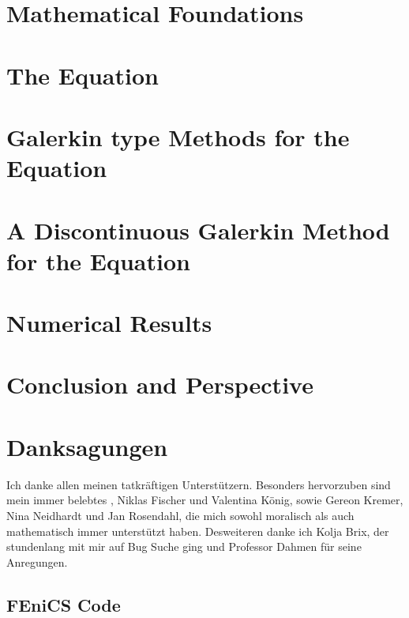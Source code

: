 \documentclass{template}
\begin{document}
\chapter{Mathematical Foundations}
\label{ch:TheoreticalBackground}



\chapter{The \MA Equation}
\label{ch:MongeAmpereEq}



\chapter{Galerkin type Methods for the \MA Equation}
\label{ch:DGMongeAmpere}


\chapter{A Discontinuous Galerkin Method for the \MA Equation}
\label{ch:ourMethod}


\chapter{Numerical Results}
\label{ch:NumericalResults}


\chapter{Conclusion and Perspective}
\label{ch:conclusion}


\chapter*{Danksagungen}
Ich danke allen meinen tatkräftigen Unterstützern. Besonders hervorzuben sind mein immer belebtes , Niklas Fischer und Valentina König, sowie Gereon Kremer, Nina Neidhardt und Jan Rosendahl, die mich sowohl moralisch als auch mathematisch immer unterstützt haben.
Desweiteren danke ich Kolja Brix, der stundenlang mit mir auf Bug Suche ging und Professor Dahmen für seine Anregungen.


\begin{appendices}
\chapter{FEniCS Code}
	
\end{appendices}



\newpage
%
\newpage


\end{document}
